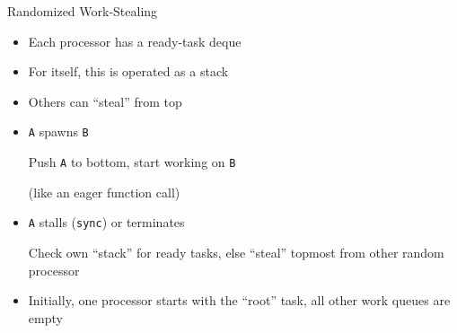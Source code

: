 \documentclass[xcolor=dvipsnames,9pt,mathserif]{beamer}
\begin{document}
\begin{frame}{Randomized Work-Stealing}
  \begin{itemize}
  \item Each processor has a ready-task deque
  \item For itself, this is operated as a stack
  \item Others can ``steal'' from top
  \item \texttt{A} spawns \texttt{B}
    
    Push \texttt{A} to bottom, start working on \texttt{B}
    
    (like an eager function call)
  \item \texttt{A} stalls (\texttt{sync}) or terminates
    
    Check own ``stack'' for ready tasks, else ``steal'' topmost from other
    random processor
    
  \item Initially, one processor starts with the ``root'' task, all
    other work queues are empty
  \end{itemize}
\end{frame}
\end{document}
